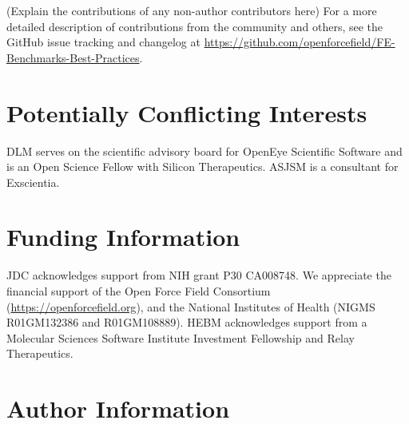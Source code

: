 \documentclass[9pt,bestpractices]{livecoms}
\newcommand{\githubrepository}{\url{https://github.com/openforcefield/FE-Benchmarks-Best-Practices}}  %
\begin{document}
(Explain the contributions of any non-author contributors here)
For a more detailed description of contributions from the community and others, see the GitHub issue tracking and changelog at \githubrepository.

\section{Potentially Conflicting Interests}

DLM serves on the scientific advisory board for OpenEye Scientific Software and is an Open Science Fellow with Silicon Therapeutics.
ASJSM is a consultant for Exscientia. 
\section{Funding Information}
JDC acknowledges support from NIH grant P30 CA008748.
We appreciate the financial support of the Open Force Field Consortium (\url{https://openforcefield.org}), and the National Institutes of Health (NIGMS R01GM132386 and R01GM108889).
HEBM acknowledges support from a Molecular Sciences Software Institute Investment Fellowship and Relay Therapeutics. 


\section*{Author Information}
\makeorcid




\end{document}
